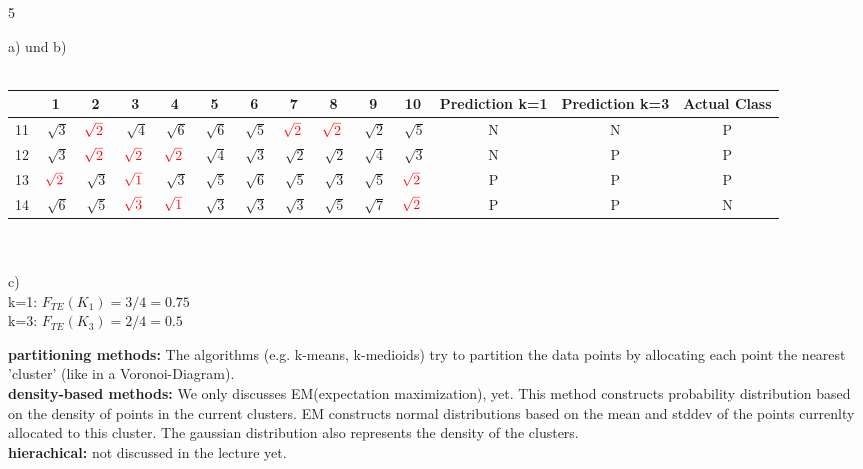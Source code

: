 \documentclass{article}
\begin{document}
\begin{ukon-infie}[29.11.17]{5}
		\begin{exercise}[p=10]{}
		a) und b)\\\\
		\begin{tabular}{|c|c|c|c|c|c|c|c|c|c|c|c|c|c|}
		\hline 
		 & 1 & 2 & 3 & 4 & 5 & 6 & 7 & 8 & 9 & 10 & Prediction k=1 & Prediction k=3 & Actual Class \\ 
		\hline 
		11 & $\sqrt[]{3}$ & $ \color{red} \sqrt[]{2}$ & $\sqrt[]{4}$ & $\sqrt[]{6}$ & $\sqrt[]{6}$ & $\sqrt[]{5}$ & $ \color{red} \sqrt[]{2}$ & $ \color{red} \sqrt[]{2}$ & $\sqrt[]{2}$ & $\sqrt[]{5}$ & N & N & P \\ 
		\hline 
		12 & $\sqrt[]{3}$ & $ \color{red} \sqrt[]{2}$ & $ \color{red} \sqrt[]{2}$ & $ \color{red} \sqrt[]{2}$ & $\sqrt[]{4}$ & $\sqrt[]{3}$ & $\sqrt[]{2}$ & $\sqrt[]{2}$ & $\sqrt[]{4}$ & $\sqrt[]{3}$ & N & P & P \\ 
		\hline 
		13 & $ \color{red} \sqrt[]{2}$ & $\sqrt[]{3}$ & $ \color{red} \sqrt[]{1}$ & $\sqrt[]{3}$ & $\sqrt[]{5}$ & $\sqrt[]{6}$ & $\sqrt[]{5}$ & $\sqrt[]{3}$ & $\sqrt[]{5}$ & $ \color{red} \sqrt[]{2}$ & P & P & P \\ 
		\hline 
		14 & $\sqrt[]{6}$ & $\sqrt[]{5}$ & $ \color{red} \sqrt[]{3}$ & $ \color{red} \sqrt[]{1}$ & $\sqrt[]{3}$ & $\sqrt[]{3}$ & $\sqrt[]{3}$ & $\sqrt[]{5}$ & $\sqrt[]{7}$ & $ \color{red} \sqrt[]{2}$ & P & P & N \\ 
		\hline 
		\end{tabular}\\\\
		c) \\
		k=1: $F_{TE}(K_1) = 3/4 =0.75$\\
		k=3: $F_{TE}(K_3) = 2/4 =0.5$\\
		
		\end{exercise}
		
		\begin{exercise}[p=4]{}
			
		\end{exercise}
		
		


		\begin{exercise}[p=3]{}
		{
			\textbf{partitioning methods:} The algorithms (e.g. k-means, k-medioids) try to partition the data points by allocating each point the nearest 'cluster' (like in a Voronoi-Diagram).\\
			\textbf{density-based methods:} We only discusses EM(expectation maximization), yet. This method constructs probability distribution based on the density of points in the current clusters. EM constructs normal distributions based on the mean and stddev of the points currenlty allocated to this cluster. The gaussian distribution also represents the density of the clusters.\\
			\textbf{hierachical:} not discussed in the lecture yet.
		}
		

		\end{exercise}
		
		
\end{ukon-infie}
\end{document}
